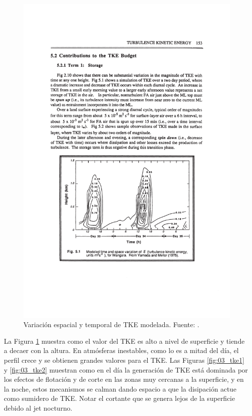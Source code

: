 \begin{figure}[h!]
	\centering
		\includegraphics[width=0.8\linewidth,trim={3cm 5.5cm 2.9cm 11.6cm},clip]{Imagenes/03/tke3}
	\caption{Variación espacial y temporal de TKE modelada. Fuente: \cite{stull1988introduction}.}
	\label{fig:03_tke3}
\end{figure}

La Figura \ref{fig:03_tke3} muestra como el valor del TKE es alto a nivel de superficie y tiende a decaer con la altura. En atmósferas inestables, como lo es a mitad del día, el perfil crece y se obtienen grandes valores para el TKE. Las Figuras \ref{fig:03_tke1} y \ref{fig:03_tke2} muestran como en el día la generación de TKE está dominada por los efectos de flotación y de corte en las zonas muy cercanas a la superficie, y en la noche, estos mecanismos se calman dando espacio a que la disipación actue como sumidero de TKE. Notar el cortante que se genera lejos de la superficie debido al jet nocturno.

